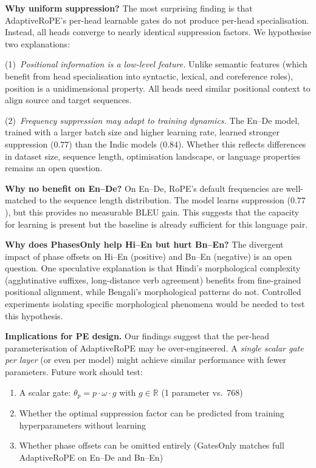 \documentclass[conference]{IEEEtran}
\begin{document}
\textbf{Why uniform suppression?} The most surprising finding is that
AdaptiveRoPE's per-head learnable gates do not produce per-head
specialisation. Instead, all heads converge to nearly identical suppression
factors. We hypothesise two explanations:

(1)~\emph{Positional information is a low-level feature.} Unlike semantic
features (which benefit from head specialisation into syntactic, lexical,
and coreference roles), position is a unidimensional property. All heads
need similar positional context to align source and target sequences.

(2)~\emph{Frequency suppression may adapt to training dynamics.}
The En--De model, trained with a larger batch size and higher learning rate,
learned stronger suppression ($0.77$) than the Indic models ($0.84$).
Whether this reflects differences in dataset size, sequence length,
optimisation landscape, or language properties remains an open question.

\textbf{Why no benefit on En--De?} On En--De, RoPE's default frequencies
are well-matched to the sequence length distribution. The model learns
suppression ($0.77$), but this provides no measurable BLEU gain.
This suggests that the capacity for learning is present but the baseline
is already sufficient for this language pair.

\textbf{Why does PhasesOnly help Hi--En but hurt Bn--En?} The divergent
impact of phase offsets on Hi--En (positive) and Bn--En (negative) is
an open question. One speculative explanation is that Hindi's
morphological complexity (agglutinative suffixes, long-distance verb
agreement) benefits from fine-grained positional alignment, while
Bengali's morphological patterns do not. Controlled experiments
isolating specific morphological phenomena would be needed to test this
hypothesis.

\textbf{Implications for PE design.} Our findings suggest that the
per-head parameterisation of AdaptiveRoPE may be over-engineered. A
\emph{single scalar gate per layer} (or even per model) might achieve
similar performance with fewer parameters. Future work should test:
\begin{enumerate}
  \item A scalar gate: $\theta_p = p \cdot \omega \cdot g$ with
        $g \in \mathbb{R}$ (1 parameter vs.~768)
  \item Whether the optimal suppression factor can be predicted from
        training hyperparameters without learning
  \item Whether phase offsets can be omitted entirely (GatesOnly
        matches full AdaptiveRoPE on En--De and Bn--En)
\end{enumerate}
\end{document}
